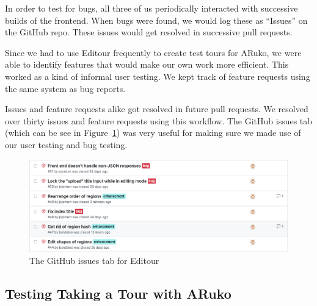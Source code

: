 \documentclass[a4paper, 10pt, american, titlepage]{article}
\begin{document}
In order to test for bugs, all three of us periodically interacted with
successive builds of the frontend. When bugs were found, we would log these as
``Issues'' on the GitHub repo. These issues would get resolved in successive
pull requests.

Since we had to use Editour frequently to create test tours for ARuko, we were
able to identify features that would make our own work more efficient. This
worked as a kind of informal user testing. We kept track of feature requests
using the same system as bug reports.

Issues and feature requests alike got resolved in future pull requests. We
resolved over thirty issues and feature requests using this workflow. The
GitHub issues tab (which can be see in Figure~\ref{fig:issuesPageExample}) was
very useful for making sure we made use of our user testing and bug testing.

\begin{figure}[h]
	\centering
	\includegraphics[width=\textwidth]{issues-page-example.png}
	\caption{The GitHub issues tab for Editour}
	\label{fig:issuesPageExample}
\end{figure}

\subsection{Testing Taking a Tour with ARuko}
\label{sec:testingARuko}
\end{document}
